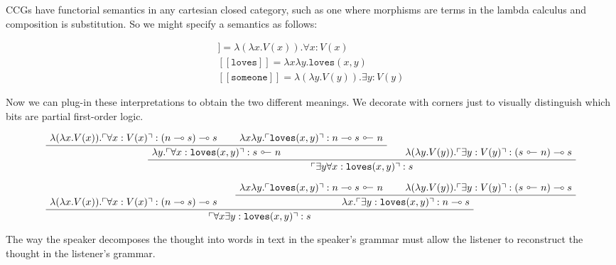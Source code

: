 \begin{fullwidth}
\begin{example}
CCGs have functorial semantics in any cartesian closed category, such as one where morphisms are terms in the lambda calculus and composition is substitution. So we might specify a semantics as follows:

\begin{align}
[\![ \texttt{everyone} ]\!] = \lambda (\lambda x . V(x)) . \forall x : V(x) \\
[\![ \texttt{loves} ]\!] = \lambda x \lambda y . \texttt{loves}(x,y) \\
[\![ \texttt{someone} ]\!] = \lambda (\lambda y . V(y)) . \exists y : V(y)
\end{align}

Now we can plug-in these interpretations to obtain the two different meanings. We decorate with corners just to visually distinguish which bits are partial first-order logic.

\[
\AxiomC{$\lambda (\lambda x . V(x)) . \ulcorner \forall x : V(x) \urcorner : (n \multimap s) \multimap s$}
\AxiomC{$\lambda x \lambda y . \ulcorner \texttt{loves}(x,y) \urcorner : n \multimap s \ \rotatebox[origin=c]{180}{$\multimap$} \ n$}
\BinaryInfC{$ \lambda y . \ulcorner \forall x : \texttt{loves}(x,y) \urcorner : s \ \rotatebox[origin=c]{180}{$\multimap$} \ n$}
\AxiomC{$\lambda (\lambda y . V(y)) . \ulcorner \exists y : V(y) \urcorner : (s \ \rotatebox[origin=c]{180}{$\multimap$} \ n) \multimap s$}
\BinaryInfC{$ \ulcorner \exists y \forall x : \texttt{loves}(x,y) \urcorner : s$}
\DisplayProof
\]

\[
\AxiomC{$\lambda (\lambda x . V(x)) . \ulcorner \forall x : V(x) \urcorner : (n \multimap s) \multimap s$}
\AxiomC{$\lambda x \lambda y . \ulcorner \texttt{loves}(x,y) \urcorner : n \multimap s \ \rotatebox[origin=c]{180}{$\multimap$} \ n$}
\AxiomC{$\lambda (\lambda y . V(y)) . \ulcorner \exists y : V(y) \urcorner : (s \ \rotatebox[origin=c]{180}{$\multimap$} \ n) \multimap s$}
\BinaryInfC{$\lambda x . \ulcorner \exists y : \texttt{loves}(x,y) \urcorner : n \multimap s$}
\BinaryInfC{$ \ulcorner \forall x \exists y : \texttt{loves}(x,y) \urcorner : s$}
\DisplayProof
\]

\end{example}

 The way the speaker decomposes the thought into words in text in the speaker's grammar must allow the listener to reconstruct the thought in the listener's grammar.


\end{fullwidth}
